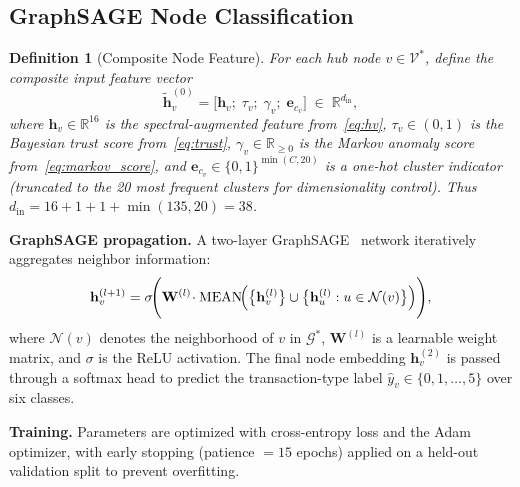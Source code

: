 \documentclass[journal]{IEEEtran}
\newtheorem{definition}{Definition}
\begin{document}
\subsection{GraphSAGE Node Classification}
\label{subsec:graphsage}

\begin{definition}[Composite Node Feature]
\label{def:node_feature}
For each hub node $v\in\mathcal{V}^{*}$, define the composite input feature
vector
\begin{equation}
  \tilde{\mathbf{h}}_{v}^{(0)}
    = \bigl[
        \mathbf{h}_{v};\;
        \tau_{v};\;
        \gamma_{v};\;
        \mathbf{e}_{c_{v}}
      \bigr]
    \;\in\; \mathbb{R}^{d_{\mathrm{in}}},
  \label{eq:composite}
\end{equation}
where $\mathbf{h}_{v}\in\mathbb{R}^{16}$ is the spectral-augmented feature
from~\eqref{eq:hv}, $\tau_{v}\in(0,1)$ is the Bayesian trust score
from~\eqref{eq:trust}, $\gamma_{v}\in\mathbb{R}_{\geq 0}$ is the Markov
anomaly score from~\eqref{eq:markov_score}, and
$\mathbf{e}_{c_{v}}\in\{0,1\}^{\min(C,20)}$ is a one-hot cluster indicator
(truncated to the 20 most frequent clusters for dimensionality control).
Thus $d_{\mathrm{in}} = 16 + 1 + 1 + \min(135, 20) = 38$.
\end{definition}

\noindent\textbf{GraphSAGE propagation.}
A two-layer GraphSAGE~\cite{Hamilton2017} network iteratively
aggregates neighbor information:
\begin{equation}
  \mathbf{h}_{v}^{(l+1)}
    = \sigma\!\Biggl(
        \mathbf{W}^{(l)}\!
        \cdot
        \mathrm{MEAN}\!\Bigl(
          \bigl\{\mathbf{h}_{v}^{(l)}\bigr\}
          \cup
          \bigl\{\mathbf{h}_{u}^{(l)} : u\in\mathcal{N}(v)\bigr\}
        \Bigr)
      \Biggr),
  \label{eq:graphsage}
\end{equation}
where $\mathcal{N}(v)$ denotes the neighborhood of $v$ in $\mathcal{G}^{*}$,
$\mathbf{W}^{(l)}$ is a learnable weight matrix, and $\sigma$ is the ReLU
activation.  The final node embedding $\mathbf{h}_{v}^{(2)}$ is passed
through a softmax head to predict the transaction-type label
$\hat{y}_{v}\in\{0,1,\ldots,5\}$ over six classes.

\noindent\textbf{Training.}
Parameters are optimized with cross-entropy loss and the Adam optimizer,
with early stopping (patience $= 15$ epochs) applied on a held-out
validation split to prevent overfitting.

\end{document}
